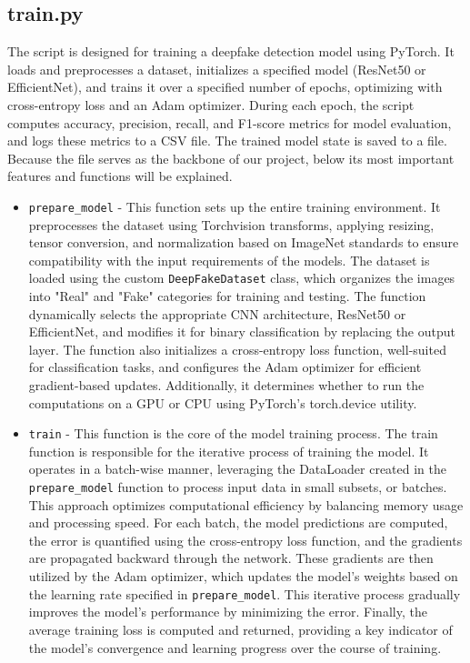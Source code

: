 \documentclass[conference]{IEEEtran}
\begin{document}
    \subsection*{train.py}
    The script is designed for training a deepfake detection model using PyTorch. It loads and preprocesses a dataset, initializes a specified model (ResNet50 or EfficientNet), and trains it over a specified number of epochs, optimizing with cross-entropy loss and an Adam optimizer. During each epoch, the script computes accuracy, precision, recall, and F1-score metrics for model evaluation, and logs these metrics to a CSV file. The trained model state is saved to a file. Because the file serves as the backbone of our project, below its most important features and functions will be explained. \\
    \begin{itemize}
        \item \texttt{prepare\_model} - This function sets up the entire training environment. It preprocesses the dataset using Torchvision transforms, applying resizing, tensor conversion, and normalization based on ImageNet standards to ensure compatibility with the input requirements of the models. The dataset is loaded using the custom \texttt{DeepFakeDataset} class, which organizes the images into "Real" and "Fake" categories for training and testing. The function dynamically selects the appropriate CNN architecture, ResNet50 or EfficientNet, and modifies it for binary classification by replacing the output layer. The function also initializes a cross-entropy loss function, well-suited for classification tasks, and configures the Adam optimizer for efficient gradient-based updates. Additionally, it determines whether to run the computations on a GPU or CPU using PyTorch’s torch.device utility. \\
        \item \texttt{train} - This function is the core of the model training process. The train function is responsible for the iterative process of training the model. It operates in a batch-wise manner, leveraging the DataLoader created in the \texttt{prepare\_model} function to process input data in small subsets, or batches. This approach optimizes computational efficiency by balancing memory usage and processing speed. For each batch, the model predictions are computed, the error is quantified using the cross-entropy loss function, and the gradients are propagated backward through the network. These gradients are then utilized by the Adam optimizer, which updates the model’s weights based on the learning rate specified in \texttt{prepare\_model}. This iterative process gradually improves the model's performance by minimizing the error. Finally, the average training loss is computed and returned, providing a key indicator of the model's convergence and learning progress over the course of training. \\

\end{itemize}
\end{document}
